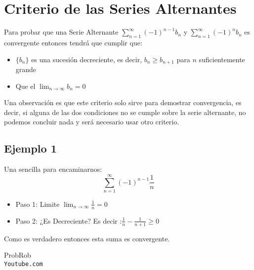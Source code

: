 \documentclass[12pt]{report}                                %
\begin{document}
    \section{Criterio de las Series Alternantes}

        Para probar que una Serie Alternante $\sum_{n=1}^{\infty} (-1)^{n-1} b_n$ y $\sum_{n=1}^{\infty} (-1)^n b_n$ es convergente entonces tendrá que cumplir que:

        \begin{itemize}
            \item $\{b_n\}$ es una sucesión decreciente, es decir, $b_n \geq b_{n+1}$ para $n$ suficientemente grande
            \item Que el $\lim_{n \to \infty} b_n = 0$
        \end{itemize}

        Una observación es que este criterio solo sirve para demostrar convergencia, es decir, si alguna de las dos condiciones no se cumple sobre la serie alternante, no podemos concluir nada y será necesario usar otro criterio.

        \subsection{Ejemplo 1}
        Una sencilla para encaminarnos:
        \begin{equation*}
            \sum_{n=1}^{\infty} (-1)^{n-1} \frac{1}{n}
        \end{equation*}


         \begin{itemize}
            \item Paso 1: Limite $\lim_{n \to \infty} \frac{1}{n}=0$
            \item Paso 2: ¿Es Decreciente? Es decir :$\frac{1}{n}-\frac{1}{n+1} \geq 0 $
         \end{itemize}

        Como es verdadero entonces esta suma es convergente.





\clearpage

    \begin{thebibliography}{9}

        ProbRob
        \\\texttt{Youtube.com}


     

\end{thebibliography}
\end{document}
